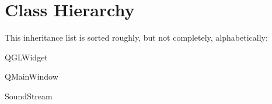 \section{Class Hierarchy}
This inheritance list is sorted roughly, but not completely, alphabetically\+:\begin{DoxyCompactList}
\item Q\+G\+L\+Widget\begin{DoxyCompactList}
\item {}
\end{DoxyCompactList}
\item Q\+Main\+Window\begin{DoxyCompactList}
\item {}
\end{DoxyCompactList}
\item Sound\+Stream\begin{DoxyCompactList}
\item {}
\end{DoxyCompactList}
\item {}
\item {}
\begin{DoxyCompactList}
\item {}
\end{DoxyCompactList}
\end{DoxyCompactList}
